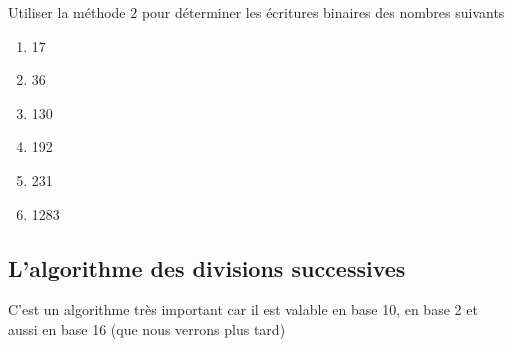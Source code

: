 \documentclass[a4paper,12pt,french]{book}
\begin{document}
\begin{exercice}[]
	Utiliser la méthode 2 pour déterminer les écritures binaires des nombres suivants
	\begin{multicols}{3}
		\begin{enumerate}[\bfseries 1.]
			\item 	17
			\item 	36
			\item 	130
			\item 	192
			\item	231
			\item 	1283
		\end{enumerate}
	\end{multicols}
\end{exercice}
\subsection{L'algorithme des divisions successives}

C'est un algorithme très important car il est valable en base 10, en base 2 et aussi en base 16 (que nous verrons plus tard)
\end{document}
